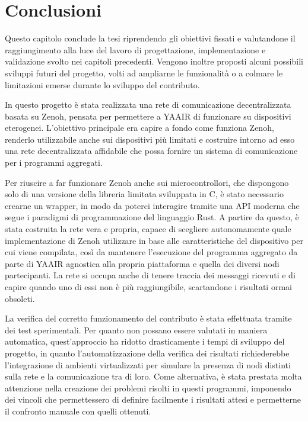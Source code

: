 \chapter{Conclusioni}
\label{chap:conclusions}

Questo capitolo conclude la tesi riprendendo gli obiettivi fissati e valutandone
il raggiungimento alla luce del lavoro di progettazione, implementazione e
validazione svolto nei capitoli precedenti.
Vengono inoltre proposti alcuni possibili sviluppi futuri del progetto, volti
ad ampliarne le funzionalità o a colmare le limitazioni emerse durante lo
sviluppo del contributo.

In questo progetto è stata realizzata una rete di comunicazione decentralizzata
basata su Zenoh, pensata per permettere a \ac{YAAIR} di funzionare su dispositivi
eterogenei.
L'obiettivo principale era capire a fondo come funziona Zenoh, renderlo
utilizzabile anche sui dispositivi più limitati e costruire intorno ad esso
una rete decentralizzata affidabile che possa fornire un sistema di comunicazione
per i programmi aggregati.

Per riuscire a far funzionare Zenoh anche sui microcontrollori, che dispongono
solo di una versione della libreria limitata sviluppata in C, è
stato necessario crearne un wrapper, in modo da poterci interagire tramite una
\ac{API} moderna che segue i paradigmi di programmazione del linguaggio Rust.
A partire da questo, è stata costruita la rete vera e propria, capace di scegliere
autonomamente quale implementazione di Zenoh utilizzare in base alle caratteristiche
del dispositivo per cui viene compilata, così da mantenere l'esecuzione del
programma aggregato da parte di \ac{YAAIR} agnostica alla propria piattaforma e
quella dei diversi nodi partecipanti.
La rete si occupa anche di tenere traccia dei messaggi ricevuti e di capire quando
uno di essi non è più raggiungibile, scartandone i risultati ormai obsoleti.

La verifica del corretto funzionamento del contributo è stata effettuata tramite
dei test sperimentali. Per quanto non possano essere valutati in maniera automatica,
quest'approccio ha ridotto drasticamente i tempi di sviluppo del progetto, in quanto
l'automatizzazione della verifica dei risultati richiederebbe l'integrazione di
ambienti virtualizzati per simulare la presenza di nodi distinti sulla rete e la
comunicazione tra di loro.
Come alternativa, è stata prestata molta attenzione nella creazione dei problemi
risolti in questi programmi, imponendo dei vincoli che permettessero di definire
facilmente i risultati attesi e permetterne il confronto manuale con quelli
ottenuti.

